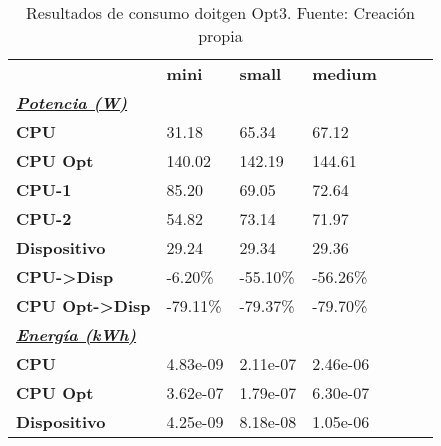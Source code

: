 \begin{table}[H]
    \centering
    \begin{tabular}{lllllll}
    \rowcolor[HTML]{DAE8FC} \ & \textbf{mini} & \textbf{	small} & \textbf{	medium} \\
    \cellcolor[HTML]{DAE8FC} \textbf{\textbf{{\emph{{\underline{{Potencia (W)}}}}}}} &  & 	 & 	 \\
    \rowcolor[HTML]{EFEFEF} \cellcolor[HTML]{DAE8FC} \textbf{CPU} & 31.18 & 	65.34 & 	67.12 \\
    \cellcolor[HTML]{DAE8FC} \textbf{CPU Opt} & 140.02 & 	142.19 & 	144.61 \\
    \rowcolor[HTML]{EFEFEF} \cellcolor[HTML]{DAE8FC} \textbf{\quad CPU-1} & 85.20 & 	69.05 & 	72.64 \\
    \cellcolor[HTML]{DAE8FC} \textbf{\quad CPU-2} & 54.82 & 	73.14 & 	71.97 \\
    \rowcolor[HTML]{EFEFEF} \cellcolor[HTML]{DAE8FC} \textbf{Dispositivo} & 29.24 & 	29.34 & 	29.36 \\
    \cellcolor[HTML]{DAE8FC} \textbf{CPU->Disp} & -6.20\% & 	-55.10\% & 	-56.26\% \\
    \rowcolor[HTML]{EFEFEF} \cellcolor[HTML]{DAE8FC} \textbf{CPU Opt->Disp} & -79.11\% & 	-79.37\% & 	-79.70\% \\
    \cellcolor[HTML]{DAE8FC} \textbf{\textbf{{\emph{{\underline{{Energía (kWh)}}}}}}} &  & 	 & 	 \\
    \rowcolor[HTML]{EFEFEF} \cellcolor[HTML]{DAE8FC} \textbf{CPU} & 4.83e-09 & 	2.11e-07 & 	2.46e-06 \\
    \cellcolor[HTML]{DAE8FC} \textbf{CPU Opt} & 3.62e-07 & 	1.79e-07 & 	6.30e-07 \\
    \rowcolor[HTML]{EFEFEF} \cellcolor[HTML]{DAE8FC} \textbf{Dispositivo} & 4.25e-09 & 	8.18e-08 & 	1.05e-06 \\
    \end{tabular}
    \caption[Resultados de consumo doitgen Opt3]{{Resultados de consumo doitgen Opt3. Fuente: Creación propia}}
    \label{table_test_doitgen_Opt3_hw_powerResults}
\end{table}